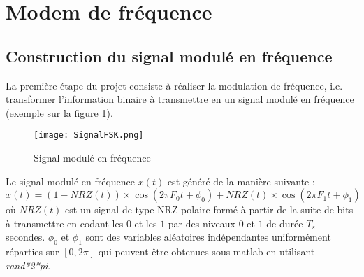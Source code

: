 \documentclass[frenchb]{article}
\begin{document}
\section{Modem de fréquence}
    \subsection{Construction du signal modulé en fréquence} \label{sec:signal}
    La première étape du projet consiste à réaliser la modulation de fréquence, i.e. transformer l'information binaire à transmettre en un signal modulé en fréquence (exemple sur la figure \ref{fig : signalFSK}).\\
        \begin{figure}[ht!]
            \centering
            \texttt{[image: SignalFSK.png]}
            \caption{Signal modulé en fréquence \label{fig : signalFSK}}
        \end{figure}
    
    Le signal modulé en fréquence $x(t)$ est généré de la manière suivante :
            \begin{equation} \label{signal_mod_freq}
            x(t)=(1-NRZ(t)) \times \cos(2 \pi F_0 t+\phi_0) + NRZ(t) \times \cos(2 \pi F_1 t+\phi_1)
            \end{equation}
    où $NRZ(t)$ est un signal de type NRZ polaire formé à partir de la suite de bits à transmettre en codant les $0$ et les $1$ par des niveaux $0$ et $1$ de durée $T_s$ secondes. $\phi_0$ et $\phi_1$ sont des variables aléatoires indépendantes uniformément réparties sur $\left[0, 2 \pi\right]$ qui peuvent être obtenues sous matlab en utilisant \emph{rand*2*pi}.
\end{document}
